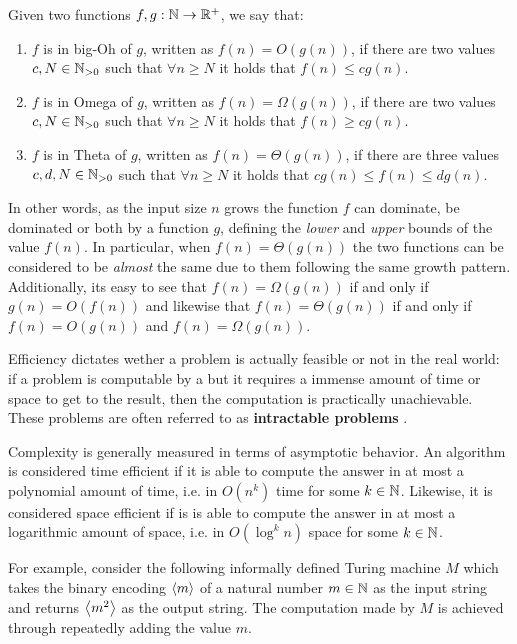 \begin{definition}
    Given two functions $f, g : \mathbb{N} \to \mathbb{R}^+$, we say that:
    \begin{enumerate}
        \item $f$ is in big-Oh of $g$, written as $f(n) = O(g(n))$, if there are two values $c, N \in \mathbb{N}_{> 0}$ such that $\forall n \geq N$ it holds that $f(n) \leq c g(n)$.
        \item $f$ is in Omega of $g$, written as $f(n) = \Omega(g(n))$, if there are two values $c, N \in \mathbb{N}_{> 0}$ such that $\forall n \geq N$ it holds that $f(n) \geq c g(n)$.
        \item $f$ is in Theta of $g$, written as $f(n) = \Theta(g(n))$, if there are three values $c,d, N \in \mathbb{N}_{> 0}$ such that $\forall n \geq N$ it holds that $c g(n) \leq f(n) \leq d g(n)$.
    \end{enumerate}
\end{definition}

\newpage

In other words, as the input size $n$ grows the function $f$ can dominate, be dominated or both by a function $g$, defining the \textit{lower} and \textit{upper} bounds of the value $f(n)$. In particular, when $f(n) = \Theta(g(n))$ the two functions can be considered to be \textit{almost} the same due to them following the same growth pattern. Additionally, its easy to see that $f(n) = \Omega(g(n))$ if and only if $g(n) = O(f(n))$ and likewise that $f(n) = \Theta(g(n))$ if and only if $f(n) = O(g(n))$ and $f(n) = \Omega(g(n))$. 

Efficiency dictates wether a problem is actually feasible or not in the real world: if a problem is computable by a \TM but it requires a immense amount of time or space to get to the result, then the computation is practically unachievable. These problems are often referred to as \textbf{intractable problems} \cite{complexity_arora_barak,sipser_computation}.

Complexity is generally measured in terms of asymptotic behavior. An algorithm is considered time efficient if it is able to compute the answer in at most a polynomial amount of time, i.e. in $O(n^k)$ time for some $k \in \mathbb{N}$. Likewise, it is considered space efficient if is is able to compute the answer in at most a logarithmic amount of space, i.e. in $O(\log^k n)$ space for some $k \in \mathbb{N}$.

For example, consider the following informally defined Turing machine $M$ which takes the binary encoding $\left\langle m\right\rangle$ of a natural number $m \in \mathbb{N}$ as the input string and returns $\left\langle m^2\right\rangle$ as the output string. The computation made by $M$ is achieved through repeatedly adding the value $m$.

